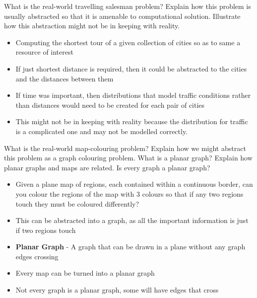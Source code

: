 \documentclass{exam}
\begin{document}
\begin{questions}
\question[5]What is the real-world travelling salesman problem? Explain how this problem is usually abstracted so that it is amenable to computational solution. Illustrate how this abstraction might not be in keeping with reality.
\begin{solution}[2in]
\begin{itemize}
	\item Computing the shortest tour of a given collection of cities so as to same a resource of interest
	\item If just shortest distance is required, then it could be abstracted to the cities and the distances between them
	\item If time was important, then distributions that model traffic conditions rather than distances would need to be created for each pair of cities
	\item This might not be in keeping with reality because the distribution for traffic is a complicated one and may not be modelled correctly.
\end{itemize}
\end{solution}
\newpage
\question[7]What is the real-world map-colouring problem? Explain how we might abstract this problem as a graph colouring problem. What is a planar graph? Explain how planar graphs and maps are related. Is every graph a planar graph?
\begin{solution}[2in]
\begin{itemize}
	\item Given a plane map of regions, each contained within a continuous border, can you colour the regions of the map with 3 colours so that if any two regions touch they must be coloured differently?
	\item This can be abstracted into a graph, as all the important information is just if two regions touch
	\item \textbf{Planar Graph} - A graph that can be drawn in a plane without any graph edges crossing
	\item Every map can be turned into a planar graph
	\item Not every graph is a planar graph, some will have edges that cross
\end{itemize}
\end{solution}


\end{questions}
\end{document}
